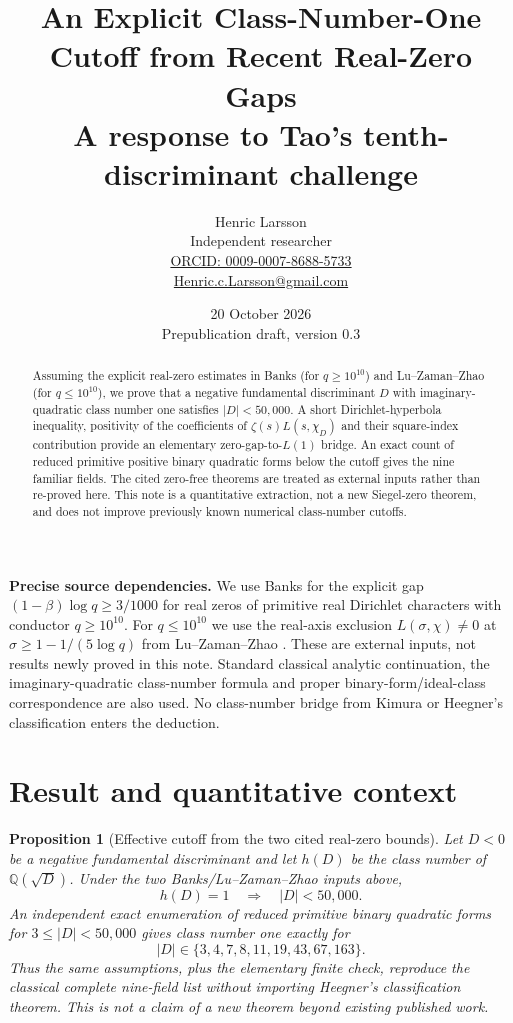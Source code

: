 \documentclass[10pt,a4paper]{article}
\title{An Explicit Class-Number-One Cutoff from Recent Real-Zero Gaps\\
\large A response to Tao's tenth-discriminant challenge}
\author{Henric Larsson\\
\small Independent researcher\\
\small \href{https://orcid.org/0009-0007-8688-5733}{ORCID: 0009-0007-8688-5733}\\
\small \href{mailto:Henric.c.Larsson@gmail.com}{Henric.c.Larsson@gmail.com}}
\date{20 October 2026\\\small Prepublication draft, version 0.3}
\newtheorem{proposition}[lemma]{Proposition}
\begin{document}
\maketitle
\begin{abstract}
Assuming the explicit real-zero estimates in Banks (for $q\ge10^{10}$)
and Lu--Zaman--Zhao (for $q\le10^{10}$), we prove that a negative
fundamental discriminant $D$ with imaginary-quadratic class number one
satisfies $|D|<50{,}000$. A short Dirichlet-hyperbola inequality,
positivity of the coefficients of $\zeta(s)L(s,\chi_D)$ and their
square-index contribution provide an elementary zero-gap-to-$L(1)$ bridge.
An exact count of reduced primitive positive binary quadratic forms below
the cutoff gives the nine familiar fields. The cited zero-free theorems are treated as external inputs rather than
re-proved here.
This note is a quantitative extraction, not a new Siegel-zero theorem,
and does not improve previously known numerical class-number cutoffs.
\end{abstract}
\noindent\textbf{Precise source dependencies.}
We use Banks \cite{banks} for the explicit gap
$(1-\beta)\log q\ge3/1000$ for real zeros of primitive real Dirichlet
characters with conductor $q\ge10^{10}$. For $q\le10^{10}$ we use the
real-axis exclusion $L(\sigma,\chi)\ne0$ at
$\sigma\ge1-1/(5\log q)$ from Lu--Zaman--Zhao \cite[Theorem~1.1]{lzz}. These are external inputs, not results newly proved in this note. Standard classical
analytic continuation, the imaginary-quadratic class-number formula and
proper binary-form/ideal-class correspondence are also used.
No class-number bridge from Kimura \cite{kimura} or Heegner's
classification enters the deduction.

\section{Result and quantitative context}
\begin{proposition}[Effective cutoff from the two cited real-zero bounds]
Let $D<0$ be a negative fundamental discriminant and let
$h(D)$ be the class number of $\mathbb Q(\sqrt D)$. Under the two
Banks/Lu--Zaman--Zhao inputs above,
\[
  \boxed{\ h(D)=1\quad\Longrightarrow\quad |D|<50{,}000.\ }
\]
An independent exact enumeration of reduced primitive binary quadratic
forms for $3\le|D|<50{,}000$ gives class number one exactly for
\[
 |D|\in\{3,4,7,8,11,19,43,67,163\}.
\]
Thus the same assumptions, plus the elementary finite check, reproduce
the classical complete nine-field list without importing Heegner's
classification theorem. This is \emph{not} a claim of a new theorem beyond
existing published work.
\end{proposition}
\end{document}

